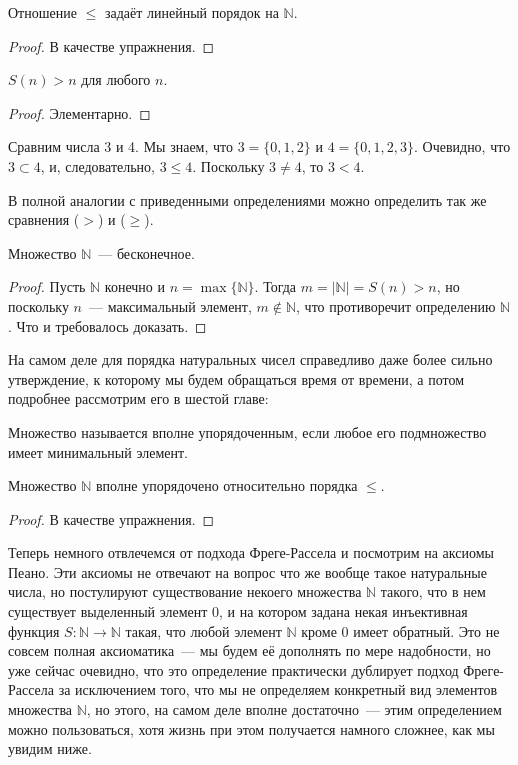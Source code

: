 \begin{thm}
Отношение $\le$ задаёт линейный порядок на $\mathbb{N}$.
\end{thm}
\begin{proof}В качестве упражнения.\end{proof}

\begin{thm}
$S(n) > n$ для любого $n$.
\end{thm}
\begin{proof}
Элементарно.
\end{proof}

\begin{example}
Сравним числа 3 и 4. Мы знаем, что $3 = \{0, 1, 2\}$ и $4 = \{0, 1, 2, 3\}$. Очевидно, что $3\subset 4$, и, следовательно, $3\le4$. Поскольку $3\not= 4$, то $3<4$.
\end{example}

В полной аналогии с приведенными определениями можно определить так же сравнения  ($>$) и  ($\ge$).

\begin{thm}
Множество $\mathbb{N}$~--- бесконечное.
\end{thm}
\begin{proof}
Пусть $\mathbb{N}$ конечно и $n = \max\{\mathbb{N}\}$. Тогда $m = |\mathbb{N}| = S(n) > n$, но поскольку $n$~--- максимальный элемент, $m\not\in\mathbb{N}$, что противоречит определению $\mathbb{N}$. Что и требовалось доказать.
\end{proof}

На самом деле для порядка натуральных чисел справедливо даже более сильно утверждение, к которому мы будем обращаться время от времени, а потом подробнее рассмотрим его в шестой главе:

\begin{definition}
Множество называется вполне упорядоченным, если любое его подмножество имеет минимальный элемент.
\end{definition}

\begin{thm}
Множество $\mathbb{N}$ вполне упорядочено относительно порядка $\le$.
\end{thm}
\begin{proof}
В качестве упражнения.
\end{proof}

Теперь немного отвлечемся от подхода Фреге-Рассела и посмотрим на аксиомы Пеано. Эти аксиомы не отвечают на вопрос что же вообще такое натуральные числа, но постулируют существование некоего множества $\mathbb{N}$ такого, что в нем существует выделенный элемент 0, и на котором задана некая инъективная функция $S:\mathbb{N}\to\mathbb{N}$ такая, что любой элемент $\mathbb{N}$ кроме 0 имеет обратный. Это не совсем полная аксиоматика~--- мы будем её дополнять по мере надобности, но уже сейчас очевидно, что это определение практически дублирует подход Фреге-Рассела за исключением того, что мы не определяем конкретный вид элементов множества $\mathbb{N}$, но этого, на самом деле вполне достаточно~--- этим определением можно пользоваться, хотя жизнь при этом получается намного сложнее, как мы увидим ниже.

